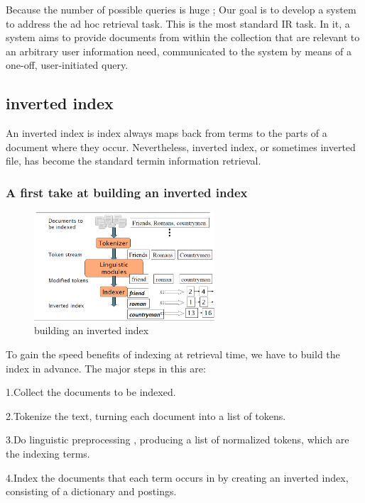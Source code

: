 Because the number of possible queries is huge ; Our goal is to develop a system to address the ad hoc retrieval task. This is the most standard IR task. In it, a system aims to provide documents from within the collection that are relevant to an arbitrary user information need, communicated to the system by means of a one-off, user-initiated query.


\subsection{inverted index}

An inverted index is index always maps back from terms to the parts of a document where they occur. Nevertheless, inverted index, or sometimes inverted file, has become the standard termin information retrieval.
 
\subsubsection{A first take at building an inverted index}

\begin{figure}[H]%
    \center%
    \includegraphics[width=0.6\textwidth]{images/shimaa/building an inverted index.png}
    \caption[This is building an inverted index]{building an inverted index}\label{fig:building an inverted index}%
\end{figure}
 
To gain the speed benefits of indexing at retrieval time, we have to build the
index in advance. The major steps in this are:

1.Collect the documents to be indexed.

2.Tokenize the text, turning each document into a list of tokens.

3.Do linguistic preprocessing , producing a list of normalized tokens, which
  are the indexing terms.
  
4.Index the documents that each term occurs in by creating an inverted index,
  consisting of a dictionary and postings.

